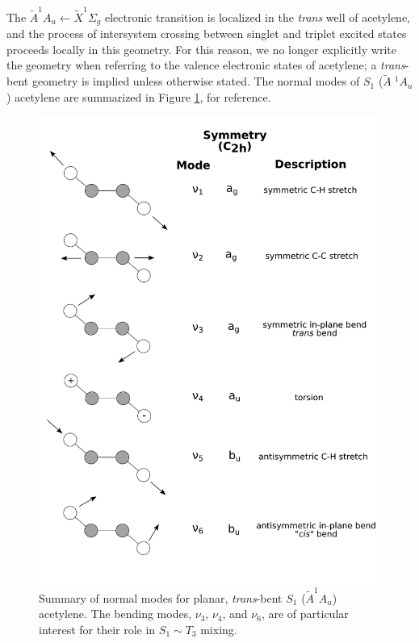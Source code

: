 \documentclass[12pt]{mitthesis}
\begin{document}
The $\tilde{A}^1A_u \leftarrow \tilde{X}^1\Sigma_g$ electronic
transition is localized in the \emph{trans} well of acetylene, and the
process of intersystem crossing between singlet and triplet excited
states proceeds locally in this geometry.  For this reason, we no
longer explicitly write the geometry when referring to the valence
electronic states of acetylene; a \emph{trans}-bent geometry is
implied unless otherwise stated.  The normal modes of $S_1$
($\tilde{A}\;^1A_u$) acetylene are summarized in Figure
\ref{fig:modes}, for reference.

\begin{figure}
  \centering
  \includegraphics[width=5.8in]{s1-modes.pdf}
  \caption{Summary of normal modes for planar, \emph{trans}-bent $S_1$
    ($\tilde{A}^1A_u$) acetylene.  The bending modes, $\nu_3$,
    $\nu_4$, and $\nu_6$, are of particular interest for their role in
    $S_1 \sim T_3$ mixing.}
  \label{fig:modes}
\end{figure} 
\end{document}
